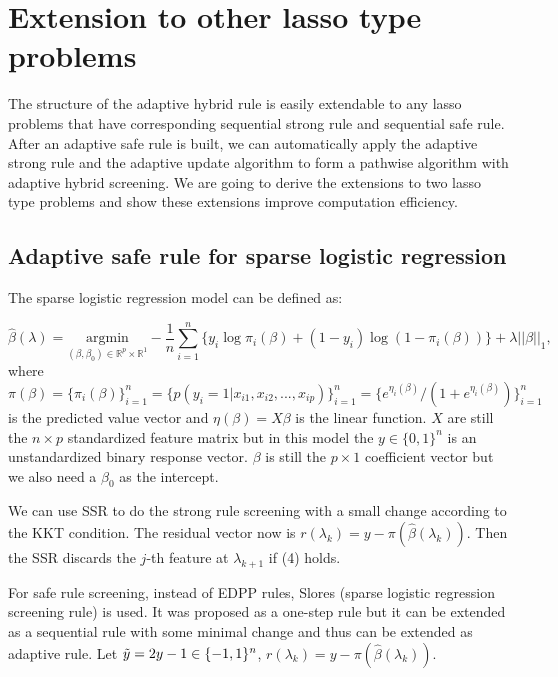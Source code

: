 \section{Extension to other lasso type problems}
\label{sec:4}

The structure of the adaptive hybrid rule is easily extendable to any lasso problems that have corresponding sequential strong rule and sequential safe rule. After an adaptive safe rule is built, we can automatically apply the adaptive strong rule and the adaptive update algorithm to form a pathwise algorithm with adaptive hybrid screening. We are going to derive the extensions to two lasso type problems and show these extensions improve computation efficiency.

\subsection{Adaptive safe rule for sparse logistic regression}

The sparse logistic regression model can be defined as:

\begin{equation}
    \hat{\beta}(\lambda)=\underset{(\beta,\beta_0)\in \mathbb{R}^p\times\mathbb{R}^1}{\mathrm{argmin}}-\frac{1}{n}\sum_{i=1}^n\{y_i\log\pi_i(\beta)+(1-y_i)\log(1-\pi_i(\beta))\}+\lambda||\beta||_1,
\end{equation}
where $\pi(\beta)=\{\pi_i(\beta)\}_{i=1}^n=\{p(y_i=1|x_{i1},x_{i2},...,x_{ip})\}_{i=1}^n=\{e^{\eta_i(\beta)}/(1+e^{\eta_i(\beta)})\}_{i=1}^n$ is the predicted value vector and $\eta(\beta)=X\beta$ is the linear function. $X$ are still the $n\times p$ standardized feature matrix but in this model the $y\in\{0,1\}^n$ is an unstandardized binary response vector. $\beta$ is still the $p\times1$ coefficient vector but we also need a $\beta_0$ as the intercept.

We can use SSR to do the strong rule screening with a small change according to the KKT condition. The residual vector now is $r(\lambda_k)=y-\pi(\hat{\beta}(\lambda_k))$. Then the SSR discards the $j$-th feature at $\lambda_{k+1}$ if (4) holds.

For safe rule screening, instead of EDPP rules, Slores (sparse logistic regression screening rule)\citep{wang2014safe} is used. It was proposed as a one-step rule but it can be extended as a sequential rule with some minimal change and thus can be extended as adaptive rule. Let $\Tilde{y}=2y-1\in\{-1,1\}^n$, $r(\lambda_k)=y-\pi(\hat{\beta}(\lambda_k))$.

